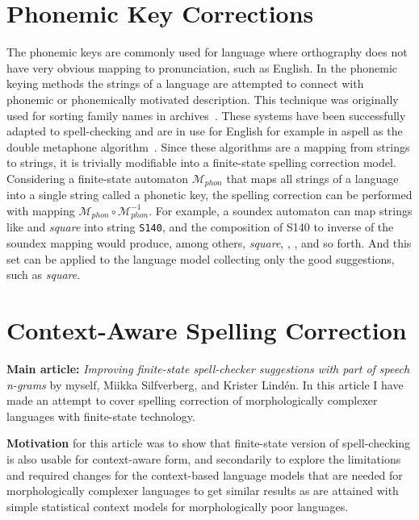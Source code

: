 \documentclass[officiallayout]{unihelcompling}
\newcommand\misspelt{\bgroup\markoverwith
{\textcolor{red}{\lower3.5pt\hbox{\sixly \char58}}}\ULon}
\begin{document}
\section{Phonemic Key Corrections}
\label{sec:phonemic}

The phonemic keys are commonly used for language where orthography does not
have very obvious mapping to pronunciation, such as English. In the phonemic
keying methods the strings of a language are attempted to connect with phonemic
or phonemically motivated description. This technique was originally used for
sorting family names in archives~\citep{russell1918soundex}. These systems have
been successfully adapted to spell-checking and are in use for English for
example in aspell as the double metaphone algorithm~\citep{philips2000double}.
Since these algorithms are a mapping from strings to strings, it is trivially
modifiable into a finite-state spelling correction model. Considering a
finite-state automaton $\mathcal{M}_{phon}$ that maps all strings of a language
into a single string called a phonetic key, the spelling correction can be
performed with mapping $\mathcal{M}_{phon} \circ \mathcal{M}_{phon}^{-1}$.
For example, a soundex automaton can map strings like \misspelt{squer} and
\emph{square} into string \texttt{S140}, and the composition of S140 to 
inverse of the soundex mapping would produce, among others, \emph{square},
\misspelt{squer}, \misspelt{sqr}, \misspelt{sqrrr} and so forth. And this set
can be applied to the language model collecting only the good suggestions, such
as \emph{square}.

\section{Context-Aware Spelling Correction}
\label{sec:context}

\textbf{Main article:} \emph{Improving finite-state spell-checker suggestions
with part of speech n-grams} by myself, Miikka Silfverberg, and Krister
Lindén. In this article I have made an attempt to cover spelling correction
of morphologically complexer languages with finite-state technology.

\textbf{Motivation} for this article was to show that finite-state version of
spell-checking is also usable for context-aware form, and secondarily to
explore the limitations and required changes for the context-based language
models that are needed for morphologically complexer languages to get similar
results as are attained with simple statistical context models for
morphologically poor languages.
\end{document}
